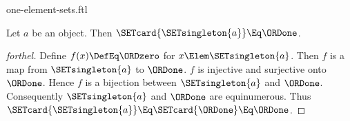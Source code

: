 \documentclass{stex}
\begin{document}
\begin{smodule}{one-element-sets.ftl}

\begin{proposition}[forthel]
  Let $a$ be an object.
  Then $\SETcard{\SETsingleton{a}} \Eq \ORDone$.
\end{proposition}
\begin{proof}[forthel]
  Define $f(x) \DefEq \ORDzero$ for $x \Elem \SETsingleton{a}$.
  Then $f$ is a map from $\SETsingleton{a}$ to $\ORDone$.
  $f$ is injective and surjective onto $\ORDone$.
  Hence $f$ is a bijection between $\SETsingleton{a}$ and $\ORDone$.
  Consequently $\SETsingleton{a}$ and $\ORDone$ are equinumerous.
  Thus $\SETcard{\SETsingleton{a}} \Eq \SETcard{\ORDone} \Eq \ORDone$.
\end{proof}
\end{smodule}
\end{document}
